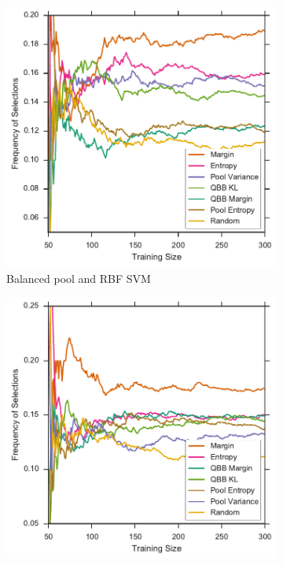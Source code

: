 \begin{figure}[p]
\begin{subfigure}{.5\textwidth}
		\includegraphics[width=\linewidth]{figures/5_thompson/sdss_br_frequencies}
		\caption{Balanced pool and RBF SVM}
		\label{fig:sdss_br_frequencies}
	\end{subfigure}
	\begin{subfigure}{.5\textwidth}
		\centering
		\includegraphics[width=\textwidth]{figures/5_thompson/sdss_ul_frequencies}

\end{subfigure}
\end{figure}
